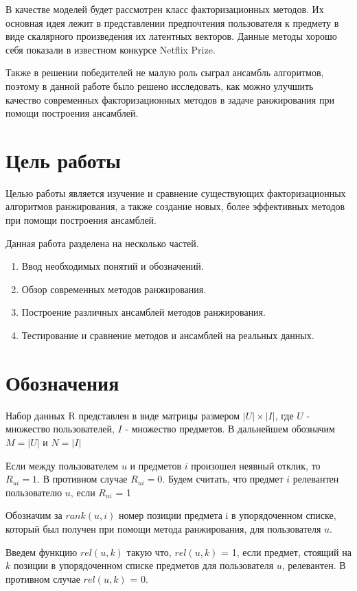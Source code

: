 \documentclass[14pt]{extarticle}
\begin{document}
В качестве моделей будет рассмотрен класс факторизационных методов. Их основная идея лежит в представлении предпочтения пользователя к предмету  в виде скалярного произведения их латентных векторов\cite{matrixfactorization}.  Данные методы хорошо себя показали в известном конкурсе Netflix Prize\cite{netflix}.

Также в решении победителей не малую роль сыграл ансамбль алгоритмов, поэтому в данной работе было  решено исследовать, как можно улучшить качество современных факторизационных методов в задаче ранжирования при помощи  построения ансамблей. 

\section{Цель работы}
Целью работы является изучение и сравнение существующих факторизационных алгоритмов ранжирования, а также создание новых, более эффективных методов при помощи построения ансамблей. 


Данная работа  разделена на несколько частей.
\begin{enumerate}
\item Ввод необходимых понятий и обозначений.
\item Обзор современных методов ранжирования.
\item Построение различных ансамблей методов ранжирования.
\item Тестирование и сравнение методов и ансамблей на реальных данных.
\end{enumerate}


\section{Обозначения}

Набор данных R представлен в виде матрицы  размером $|U| \times |I|$, где $U$ - множество пользователей,  $I$ - множество предметов. В дальнейшем обозначим $M = |U| $ и $N = |I|$

Если между пользователем $u$ и предметов $i$ произошел неявный отклик, то $R_{ui}=1$. В противном случае $R_{ui} = 0$. Будем считать, что предмет $i$ релевантен пользователю $u$, если $R_{ui}$ = 1


Обозначим за $rank(u, i)$ номер позиции предмета i в упорядоченном списке, который был получен при помощи метода ранжирования, для пользователя $u$.   

Введем функцию $rel(u, k)$ такую что, $rel(u, k)$ = 1, если предмет, стоящий на $k$ позиции в упорядоченном списке предметов для пользователя $u$, релевантен. В противном случае $rel(u, k)$ = 0.  
\end{document}
